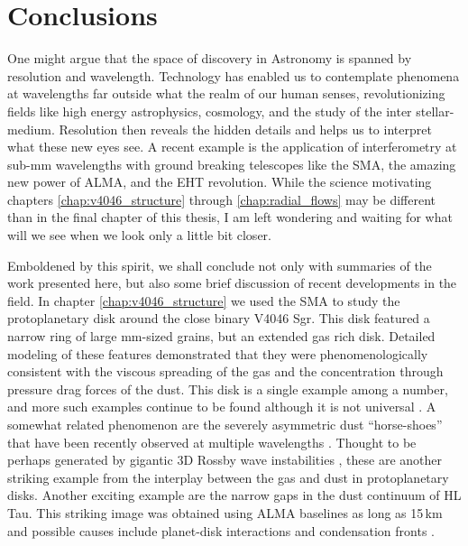 \chapter{Conclusions} \label{chap:conclusion}

One might argue that the space of discovery in Astronomy is spanned by resolution and 
wavelength.  Technology has enabled us to contemplate phenomena at wavelengths far outside 
what the realm of our human senses, revolutionizing fields like high energy astrophysics,
cosmology, and the study of the inter stellar-medium.  Resolution then reveals the hidden
details and helps us to interpret what these new eyes see.  A recent example is 
the application of interferometry at sub-mm wavelengths with ground breaking telescopes like the SMA, 
the amazing new power of ALMA, and the EHT revolution.  
While the science motivating chapters \ref{chap:v4046_structure} 
through \ref{chap:radial_flows} may be different than in the final chapter of this thesis, 
I am left wondering and waiting for what will we see when we look only a little bit closer.

Emboldened by this spirit, we shall conclude not only with summaries of the work presented here,
but also some brief discussion of recent developments in the field.  In chapter \ref{chap:v4046_structure} we 
used the SMA to study the protoplanetary disk 
around the close binary V4046 Sgr.  This disk featured a narrow ring of large mm-sized grains, 
but an extended gas rich disk.  Detailed modeling of these features demonstrated that they were 
phenomenologically consistent with the viscous spreading of the gas and the concentration through pressure 
drag forces of the dust.  This disk is a single example among a number, and more such examples continue to be 
found \citep{isella07,panic09,andrews12,degregorio-monsalvo13,ke14} although it is not universal 
\citep{huelamo15}.  A somewhat related phenomenon are the 
severely asymmetric dust  ``horse-shoes'' that have been recently observed at multiple wavelengths
\citep{vandermarel13,fukagawa13,isella13,casassus15,marino15}.  Thought to be perhaps generated by gigantic 
3D Rossby wave instabilities \citep{regaly13}, these are another striking example from the interplay between
the gas and dust in protoplanetary disks.  Another exciting example are the narrow gaps in the dust continuum
of HL Tau. This striking image was obtained using ALMA baselines as long as 15\,km and possible causes include
planet-disk interactions and condensation fronts \citep{brogan14,zhang15}.

